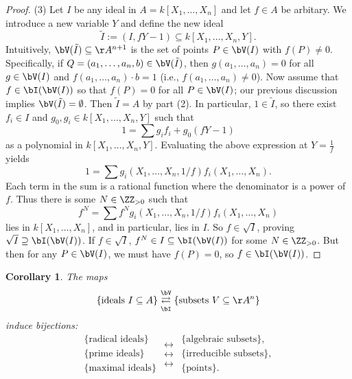 \documentclass[12pt]{amsart}
\theoremstyle{plain}
\newtheorem{corollary}[theorem]{Corollary}
\theoremstyle{definition}
\begin{document}
\begin{proof}
(3) Let $I$ be any ideal in $A = k[X_1, \ldots, X_n]$ and let $f \in A$ be arbitary.
We introduce a new variable $Y$ and define the new ideal
$$\tilde I := (I, f Y - 1) \subseteq k[X_1, \ldots, X_n, Y].$$
Intuitively, $\bV(\tilde I) \subseteq \AA^{n+1}$ is the set of points $P \in \bV(I)$ with $f(P) \ne 0$.
Specifically, if $Q = (a_1, \ldots, a_n, b) \in \bV(\tilde I)$, then $g(a_1, \ldots, a_n) = 0$ for all $g \in \bV(I)$
and $f(a_1, \ldots, a_n) \cdot b = 1$ (i.e., $f(a_1, \ldots, a_n) \ne 0$).
Now assume that $f \in \bI(\bV(I))$ so that $f(P) = 0$ for all $P \in \bV(I)$;
our previous discussion implies $\bV(\tilde I) = \emptyset$.
Then $\tilde I = A$ by part (2).
In particular, $1 \in \tilde I$, so there exist $f_i \in I$ and $g_0, g_i \in k[X_1, \ldots, X_n, Y]$ such that
$$1 = \sum g_i f_i + g_0 (f Y - 1)$$
as a polynomial in $k[X_1, \ldots, X_n, Y]$.
Evaluating the above expression at $Y = \frac{1}{f}$ yields
$$1 = \sum g_i(X_1, \ldots, X_n, 1/f) f_i(X_1, \ldots, X_n).$$
Each term in the sum is a rational function where the denominator is a power of $f$.
Thus there is some $N \in \ZZ_{> 0 }$ such that 
$$f^N = \sum f^N g_i (X_1, \ldots, X_n, 1/f) f_i(X_1,\ldots,X_n)$$
lies in $k[X_1, \ldots, X_n]$, and in particular, lies in $I$.
So $f \in \sqrt{I}$, proving $\sqrt{I} \supseteq \bI(\bV(I))$.
If $f \in \sqrt{I}$, $f^N \in I \subseteq \bI(\bV(I))$ for some $N \in \ZZ_{> 0}$.
But then for any $P \in \bV(I)$, we must have $f(P) = 0$, so $f \in \bI(\bV(I))$.
\end{proof}

\begin{corollary}\label{nullbijection}
The maps
$$\{\text{ideals } I \subseteq A\} \underset{\bI}{\overset{\bV}{\rightleftarrows}} \{\text{subsets } V \subseteq \AA^n\}$$
induce bijections:
$$
\begin{array}{c}
\{\text{radical ideals}\} \\
\{\text{prime ideals}\} \\
\{\text{maximal ideals}\} 
\end{array}
\begin{array}{c}
\longleftrightarrow \\
\longleftrightarrow \\
\longleftrightarrow  
\end{array}
\begin{array}{c}
\{\text{algebraic subsets}\}, \\
\{\text{irreducible subsets}\}, \\
\{\text{points}\} .
\end{array}
$$
\end{corollary}
\end{document}
